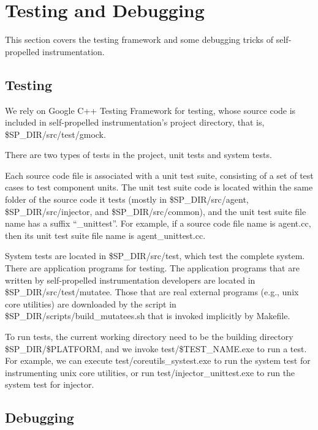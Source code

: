\section{Testing and Debugging}
This section covers the testing framework and some debugging tricks of
self-propelled instrumentation.
\subsection{Testing}
We rely on Google C++ Testing Framework for testing, whose source code is
included in self-propelled instrumentation's project directory, that is,
\$SP\_DIR/src/test/gmock.

There are two types of tests in the project, unit tests and system tests.

Each source code file is associated with a unit test suite, consisting of a set
of test cases to test component units.
The unit test suite code is located within the same folder of the source code it
tests (mostly in \$SP\_DIR/src/agent, \$SP\_DIR/src/injector, and
\$SP\_DIR/src/common), and the unit test suite file name has a suffix
``\_unittest''.
For example, if a source code file name is agent.cc, then its unit test suite
file name is agent\_unittest.cc.

System tests are located in \$SP\_DIR/src/test, which test the complete system.
There are application programs for testing.
The application programs that are written by self-propelled instrumentation
developers are located in \$SP\_DIR/src/test/mutatee.
Those that are real external programs (e.g., unix core utilities) are downloaded
by the script in \$SP\_DIR/scripts/build\_mutatees.sh that is invoked implicitly
by Makefile.

To run tests, the current working directory need to be the building directory
\$SP\_DIR/\$PLATFORM, and we invoke test/\$TEST\_NAME.exe to run a test.
For example, we can execute test/coreutils\_systest.exe to run the system test for
instrumenting unix core utilities, or run test/injector\_unittest.exe to run the
system test for injector.

\subsection{Debugging}

